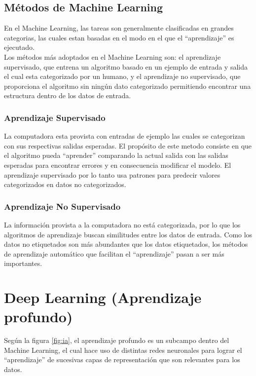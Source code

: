 \subsection{Métodos de Machine Learning}
En el Machine Learning, las tareas son generalmente clasificadas en grandes categorias, las cuales estan basadas en el modo en el que el ``aprendizaje'' es ejecutado.\\

Los métodos más adoptados en el Machine Learning son: el aprendizaje supervisado, que entrena un algoritmo basado en un ejemplo de entrada y salida el cual esta categorizado por un humano, y el aprendizaje no supervisado, que proporciona el algoritmo sin ningún dato categorizado permitiendo encontrar una estructura dentro de los datos de entrada.\

\subsubsection{Aprendizaje Supervisado}
La computadora esta provista con entradas de ejemplo las cuales se categorizan con sus respectivas salidas esperadas. El propósito de este metodo consiste en que el algoritmo pueda  ``aprender'' comparando la actual salida con las salidas esperadas para encontrar errores y en consecuencia modificar el modelo. El aprendizaje supervisado por lo tanto usa patrones para predecir valores categorizados en datos no categorizados.\\

\subsubsection{Aprendizaje No Supervisado}
La información provista a la computadora no está categorizada, por lo que los algoritmos de aprendizaje buscan similitudes entre los datos de entrada. Como los datos no etiquetados son más abundantes que los datos etiquetados, los métodos de aprendizaje automático que facilitan el ``aprendizaje'' pasan a ser más importantes.\

\section{Deep Learning (Aprendizaje profundo)}
Según la figura \ref{fig:ia}, el aprendizaje profundo es un subcampo dentro del Machine Learning, el cual hace uso de distintas redes neuronales para lograr el ``aprendizaje'' de sucesivas capas de representación que son relevantes para los datos.\\


